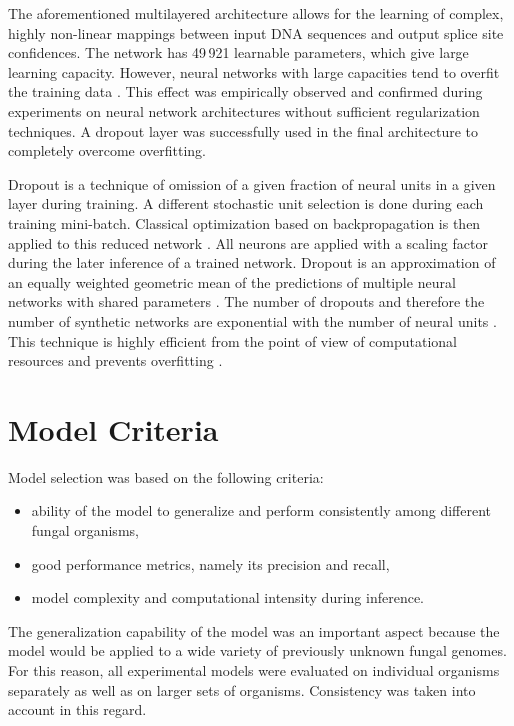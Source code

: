 The aforementioned multilayered architecture allows for the learning of
complex, highly non-linear mappings between input DNA sequences and output
splice site confidences. The network has 49\,921 learnable parameters, which
give large learning capacity. However, neural networks with large capacities
tend to overfit the training data \cite{srivastava2014dropout}. This effect was
empirically observed and confirmed during experiments on neural network
architectures without sufficient regularization techniques. A dropout layer was
successfully used in the final architecture to completely overcome overfitting.

Dropout is a technique of omission of a given fraction of neural units in a
given layer during training. A different stochastic unit selection is done
during each training mini-batch. Classical optimization based on
backpropagation is then applied to this reduced network
\cite{srivastava2014dropout}. All neurons are applied with a scaling factor
during the later inference of a trained network. Dropout is an approximation of
an equally weighted geometric mean of the predictions of multiple neural
networks with shared parameters \cite{srivastava2014dropout}. The number of
dropouts and therefore the number of synthetic networks are exponential with
the number of neural units \cite{srivastava2014dropout}. This technique is
highly efficient from the point of view of computational resources and prevents
overfitting \cite{srivastava2014dropout}.

\section{\label{ch:rcnn:criteria}Model Criteria}

Model selection was based on the following criteria:

\begin{itemize}
  \item ability of the model to generalize and perform consistently among
    different fungal organisms,
  \item good performance metrics, namely its precision and recall,
  \item model complexity and computational intensity during inference.
\end{itemize}

The generalization capability of the model was an important aspect because the
model would be applied to a wide variety of previously unknown fungal genomes.
For this reason, all experimental models were evaluated on individual organisms
separately as well as on larger sets of organisms. Consistency was taken into
account in this regard.

